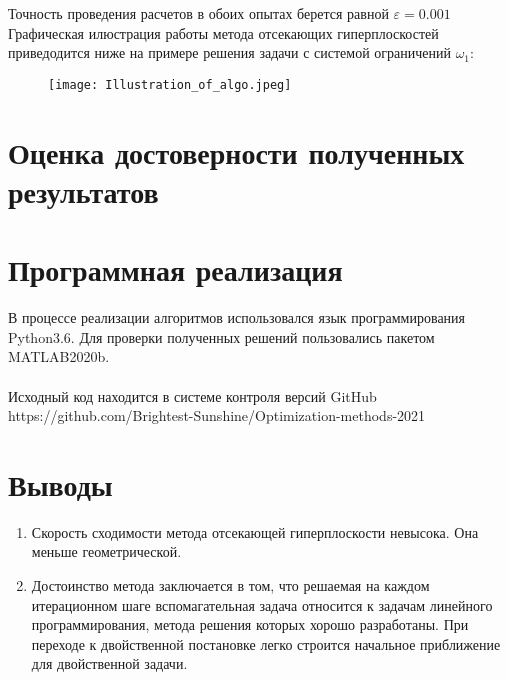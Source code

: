 \documentclass{article}
\begin{document}
\noindent Точность проведения расчетов в обоих опытах берется равной $\varepsilon = 0.001$ \\

    \noindent Графическая илюстрация работы метода отсекающих гиперплоскостей приведодится ниже на примере решения задачи с системой ограничений $\omega_1$:
    
    \begin{figure}[H]
        \centering
        \texttt{[image: Illustration\_of\_algo.jpeg]}
    \end{figure}

\section{Оценка достоверности полученных результатов}

\begin{figure}[H]
\label{fig:image}
\end{figure}
\begin{figure}[H]
\label{fig:image}
\end{figure}

\section{Программная реализация}
\noindent В процессе реализации алгоритмов использовался язык программирования Python3.6. Для проверки полученных решений пользовались пакетом MATLAB2020b.
\\\\
\noindent Исходный код находится в системе контроля версий GitHub 
\\
https://github.com/Brightest-Sunshine/Optimization-methods-2021

\section{Выводы}
\begin{enumerate}
 \item Скорость сходимости метода отсекающей гиперплоскости невысока. Она меньше геометрической.
 \item Достоинство метода заключается в том, что решаемая на каждом итерационном шаге вспомагательная задача относится к задачам линейного программирования, метода решения которых хорошо разработаны. При переходе к двойственной постановке легко строится начальное приближение для двойственной задачи.
\end{enumerate}
\end{document}
